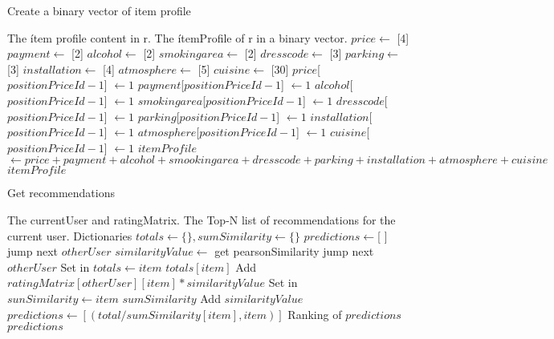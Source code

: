 \begin{algorithm}
\caption{Create a binary vector of item profile}
\begin{algorithmic} 
\REQUIRE The ítem profile content in r.
\ENSURE The ítemProfile of r in a binary vector.
\STATE $price \leftarrow $ [4]
\STATE $payment \leftarrow $ [2]
\STATE $alcohol \leftarrow $ [2]
\STATE $smokingarea \leftarrow $ [2]
\STATE $dresscode \leftarrow $ [3]
\STATE $parking \leftarrow $ [3]
\STATE $installation \leftarrow $ [4]
\STATE $atmosphere \leftarrow $ [5]
\STATE $cuisine \leftarrow $ [30]
\STATE $price$[$positionPriceId-1$] $\leftarrow 1$
\STATE $payment$[$positionPriceId-1$] $\leftarrow 1$
\STATE $alcohol$[$positionPriceId-1$] $\leftarrow 1$
\STATE $smokingarea$[$positionPriceId-1$] $\leftarrow 1$
\STATE $dresscode$[$positionPriceId-1$] $\leftarrow 1$
\STATE $parking$[$positionPriceId-1$] $\leftarrow 1$
\STATE $installation$[$positionPriceId-1$] $\leftarrow 1$
\STATE $atmosphere$[$positionPriceId-1$] $\leftarrow 1$
\STATE $cuisine$[$positionPriceId-1$] $\leftarrow 1$
\STATE $itemProfile$ $\leftarrow price+payment+alcohol+smookingarea+dresscode+parking+installation+atmosphere+cuisine$
\RETURN $itemProfile$
\end{algorithmic}
\end{algorithm}
\begin{algorithm}
\caption{Get recommendations}
\begin{algorithmic} 
\REQUIRE The currentUser and ratingMatrix.
\ENSURE The Top-N list of recommendations for the current user. 
\STATE Dictionaries $totals \leftarrow \{ \}, sumSimilarity \leftarrow \{ \}$ 
\STATE $predictions \leftarrow $[ ]
\STATE jump next $otherUser$
\ENDIF
\STATE $similarityValue \leftarrow $ get pearsonSimilarity
\STATE jump next $otherUser$
\ENDIF
{}
\STATE Set in $totals \leftarrow item$
\STATE $totals[item]$ Add $ratingMatrix[otherUser][item]*similarityValue$
\STATE Set in $sunSimilarity \leftarrow item$
\STATE $sumSimilarity$ Add $similarityValue$
\ENDIF
\ENDIF
\ENDFOR
\ENDFOR
{}
\STATE $predictions \leftarrow [(total/sumSimilarity[item], item)]$
\ENDFOR
\STATE Ranking of $predictions$
\RETURN $predictions$
\end{algorithmic}
\end{algorithm}
